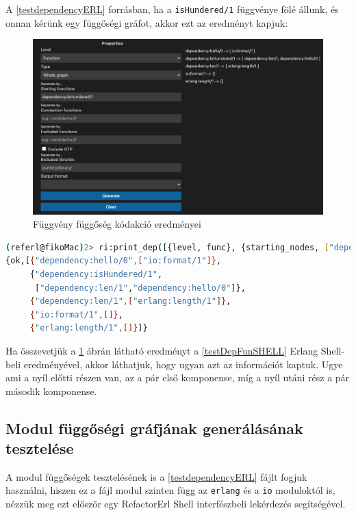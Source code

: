 A \ref{testdependencyERL} forrásban, ha a \lstinline{isHundered/1} függvénye fölé állunk, és onnan kérünk egy függőségi gráfot, akkor ezt az eredményt kapjuk:

\begin{figure}[H]
  \centering
  \includegraphics[width=\linewidth]{images/testCases/funDep.png}
  \caption{Függvény függőség kódakció eredményei}
  \label{fig:funDep}
\end{figure}


\lstset{caption=Függvány függőség lekérdezésének eredménye, label=src:sh} \label{testDepFunSHELL}
\begin{lstlisting}[language={sh}]  
(referl@fikoMac)2> ri:print_dep([{level, func}, {starting_nodes, ["dependency:isHundered/1"]}]).
{ok,[{"dependency:hello/0",["io:format/1"]},
     {"dependency:isHundered/1",
      ["dependency:len/1","dependency:hello/0"]},
     {"dependency:len/1",["erlang:length/1"]},
     {"io:format/1",[]},
     {"erlang:length/1",[]}]}
\end{lstlisting}


Ha összevetjük a \ref{fig:funDep} ábrán látható eredményt a \ref{testDepFunSHELL} Erlang Shell-beli eredményével, akkor láthatjuk, hogy ugyan azt az információt kaptuk. Ugye ami a nyíl előtti részen van, az a pár első komponense, míg a nyíl utáni rész a pár második komponense.


\subsection{Modul függőségi gráfjának generálásának tesztelése}

A modul függőségek tesztelésének is a \ref{testdependencyERL} fájlt fogjuk használni, hiszen ez a fájl modul szinten függ az \lstinline{erlang} és a \lstinline{io} moduloktól is, nézzük meg ezt először egy RefactorErl Shell interfészbeli lekérdezés segítségével.


